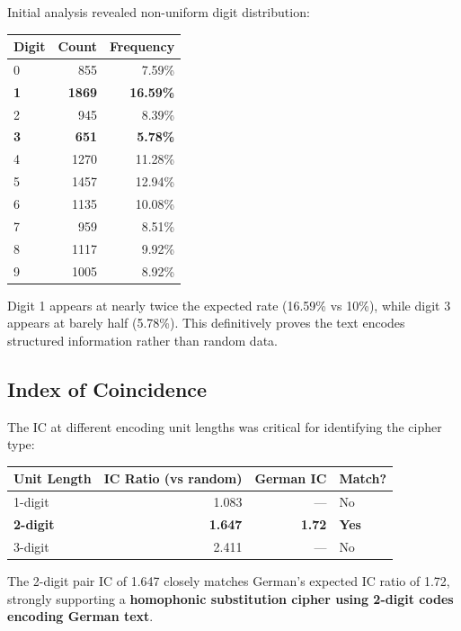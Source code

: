 \documentclass[11pt,a4paper]{article}
\begin{document}
Initial analysis revealed non-uniform digit distribution:

\begin{table}[h]
\centering
\begin{tabular}{lrr}
\toprule
Digit & Count & Frequency \\
\midrule
0 & 855 & 7.59\% \\
\textbf{1} & \textbf{1869} & \textbf{16.59\%} \\
2 & 945 & 8.39\% \\
\textbf{3} & \textbf{651} & \textbf{5.78\%} \\
4 & 1270 & 11.28\% \\
5 & 1457 & 12.94\% \\
6 & 1135 & 10.08\% \\
7 & 959 & 8.51\% \\
8 & 1117 & 9.92\% \\
9 & 1005 & 8.92\% \\
\bottomrule
\end{tabular}
\end{table}

Digit 1 appears at nearly twice the expected rate (16.59\% vs 10\%), while digit 3 appears at barely half (5.78\%). This definitively proves the text encodes structured information rather than random data.

\subsection{Index of Coincidence}

The IC at different encoding unit lengths was critical for identifying the cipher type:

\begin{table}[h]
\centering
\begin{tabular}{lrrl}
\toprule
Unit Length & IC Ratio (vs random) & German IC & Match? \\
\midrule
1-digit & 1.083 & --- & No \\
\textbf{2-digit} & \textbf{1.647} & \textbf{1.72} & \textbf{Yes} \\
3-digit & 2.411 & --- & No \\
\bottomrule
\end{tabular}
\end{table}

The 2-digit pair IC of 1.647 closely matches German's expected IC ratio of 1.72, strongly supporting a \textbf{homophonic substitution cipher using 2-digit codes encoding German text}.
\end{document}
